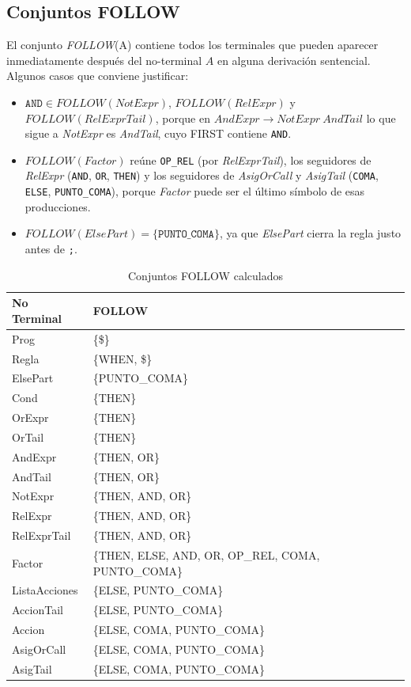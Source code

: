\documentclass[12pt,a4paper]{article}
\begin{document}
\subsection{Conjuntos FOLLOW}
El conjunto \textit{FOLLOW}(A) contiene todos los terminales que pueden aparecer inmediatamente después del no-terminal $A$ en alguna derivación sentencial. Algunos casos que conviene justificar:
\begin{itemize}[leftmargin=1cm]
    \item $\texttt{AND} \in FOLLOW(NotExpr)$, $FOLLOW(RelExpr)$ y $FOLLOW(RelExprTail)$, porque en $AndExpr \to NotExpr\ AndTail$ lo que sigue a \textit{NotExpr} es \textit{AndTail}, cuyo FIRST contiene \texttt{AND}.
    \item $FOLLOW(Factor)$ reúne \texttt{OP\_REL} (por \textit{RelExprTail}), los seguidores de \textit{RelExpr} (\texttt{AND}, \texttt{OR}, \texttt{THEN}) y los seguidores de \textit{AsigOrCall} y \textit{AsigTail} (\texttt{COMA}, \texttt{ELSE}, \texttt{PUNTO\_COMA}), porque \textit{Factor} puede ser el último símbolo de esas producciones.
    \item $FOLLOW(ElsePart) = \{\texttt{PUNTO\_COMA}\}$, ya que \textit{ElsePart} cierra la regla justo antes de \texttt{;}.
\end{itemize}

\begin{table}[H]
\centering
\begin{tabular}{|l|p{9.5cm}|}
\hline
\textbf{No Terminal} & \textbf{FOLLOW}\\ \hline
Prog & \{\$\}\\ \hline
Regla & \{WHEN, \$\}\\ \hline
ElsePart & \{PUNTO\_COMA\}\\ \hline
Cond & \{THEN\}\\ \hline
OrExpr & \{THEN\}\\ \hline
OrTail & \{THEN\}\\ \hline
AndExpr & \{THEN, OR\}\\ \hline
AndTail & \{THEN, OR\}\\ \hline
NotExpr & \{THEN, AND, OR\}\\ \hline
RelExpr & \{THEN, AND, OR\}\\ \hline
RelExprTail & \{THEN, AND, OR\}\\ \hline
Factor & \{THEN, ELSE, AND, OR, OP\_REL, COMA, PUNTO\_COMA\}\\ \hline
ListaAcciones & \{ELSE, PUNTO\_COMA\}\\ \hline
AccionTail & \{ELSE, PUNTO\_COMA\}\\ \hline
Accion & \{ELSE, COMA, PUNTO\_COMA\}\\ \hline
AsigOrCall & \{ELSE, COMA, PUNTO\_COMA\}\\ \hline
AsigTail & \{ELSE, COMA, PUNTO\_COMA\}\\ \hline
\end{tabular}
\caption{Conjuntos FOLLOW calculados}
\label{tab:follow}
\end{table}
\end{document}
